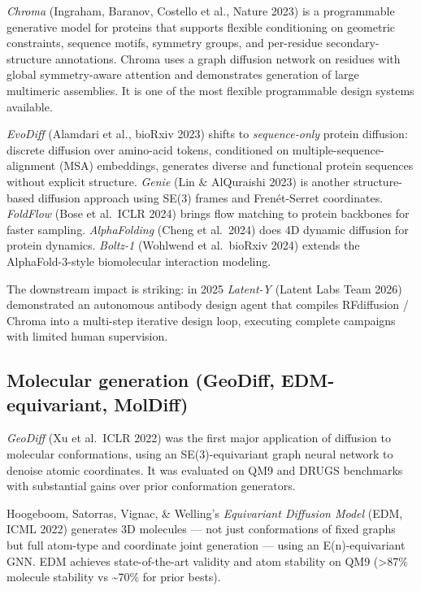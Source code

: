 \emph{Chroma} (Ingraham, Baranov, Costello et al., Nature 2023) is a programmable generative model for proteins that supports flexible conditioning on geometric constraints, sequence motifs, symmetry groups, and per-residue secondary-structure annotations. Chroma uses a graph diffusion network on residues with global symmetry-aware attention and demonstrates generation of large multimeric assemblies. It is one of the most flexible programmable design systems available.

\emph{EvoDiff} (Alamdari et al., bioRxiv 2023) shifts to \emph{sequence-only} protein diffusion: discrete diffusion over amino-acid tokens, conditioned on multiple-sequence-alignment (MSA) embeddings, generates diverse and functional protein sequences without explicit structure. \emph{Genie} (Lin \& AlQuraishi 2023) is another structure-based diffusion approach using SE(3) frames and Frenét-Serret coordinates. \emph{FoldFlow} (Bose et al.~ICLR 2024) brings flow matching to protein backbones for faster sampling. \emph{AlphaFolding} (Cheng et al.~2024) does 4D dynamic diffusion for protein dynamics. \emph{Boltz-1} (Wohlwend et al.~bioRxiv 2024) extends the AlphaFold-3-style biomolecular interaction modeling.

The downstream impact is striking: in 2025 \emph{Latent-Y} (Latent Labs Team 2026) demonstrated an autonomous antibody design agent that compiles RFdiffusion / Chroma into a multi-step iterative design loop, executing complete campaigns with limited human supervision.

\subsection{Molecular generation (GeoDiff, EDM-equivariant, MolDiff)}\label{molecular-generation-geodiff-edm-equivariant-moldiff}

\emph{GeoDiff} (Xu et al.~ICLR 2022) was the first major application of diffusion to molecular conformations, using an SE(3)-equivariant graph neural network to denoise atomic coordinates. It was evaluated on QM9 and DRUGS benchmarks with substantial gains over prior conformation generators.

Hoogeboom, Satorras, Vignac, \& Welling's \emph{Equivariant Diffusion Model} (EDM, ICML 2022) generates 3D molecules --- not just conformations of fixed graphs but full atom-type and coordinate joint generation --- using an E(n)-equivariant GNN. EDM achieves state-of-the-art validity and atom stability on QM9 (\textgreater87\% molecule stability vs \textasciitilde70\% for prior bests).

